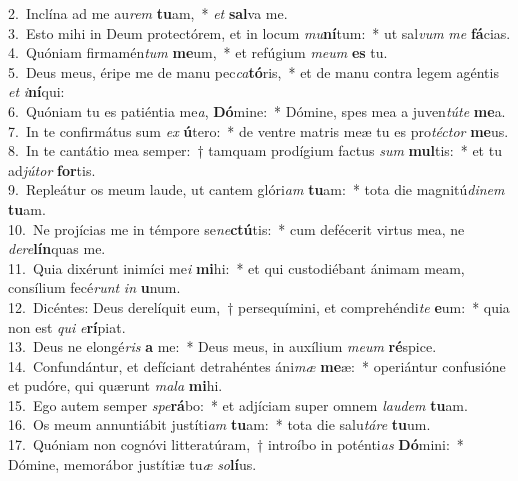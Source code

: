 {2.~}Inclína ad me au\textit{rem} \textbf{tu}am,~* \textit{et} \textbf{sal}va me.\\
{3.~}Esto mihi in Deum protectórem, et in locum \textit{mu}\textbf{ní}tum:~* ut sal\textit{vum} \textit{me} \textbf{fá}cias.\\
{4.~}Quóniam firmamén\textit{tum} \textbf{me}um,~* et refúgium \textit{me}\textit{um} \textbf{es} tu.\\
{5.~}Deus meus, éripe me de manu pec\textit{ca}\textbf{tó}ris,~* et de manu contra legem agéntis \textit{et} \textit{i}\textbf{ní}qui:\\
{6.~}Quóniam tu es patiéntia me\textit{a}, \textbf{Dó}mine:~* Dómine, spes mea a juven\textit{tú}\textit{te} \textbf{me}a.\\
{7.~}In te confirmátus sum \textit{ex} \textbf{ú}tero:~* de ventre matris meæ tu es pro\textit{té}\textit{ctor} \textbf{me}us.\\
{8.~}In te cantátio mea semper:~† tamquam prodígium factus \textit{sum} \textbf{mul}tis:~* et tu ad\textit{jú}\textit{tor} \textbf{for}tis.\\
{9.~}Repleátur os meum laude, ut cantem glóri\textit{am} \textbf{tu}am:~* tota die magnitú\textit{di}\textit{nem} \textbf{tu}am.\\
{10.~}Ne projícias me in témpore se\textit{ne}\textbf{ctú}tis:~* cum defécerit virtus mea, ne \textit{de}\textit{re}\textbf{lín}quas me.\\
{11.~}Quia dixérunt inimíci me\textit{i} \textbf{mi}hi:~* et qui custodiébant ánimam meam, consílium fecé\textit{runt} \textit{in} \textbf{u}num.\\
{12.~}Dicéntes: Deus derelíquit eum,~† persequímini, et comprehéndi\textit{te} \textbf{e}um:~* quia non est \textit{qui} \textit{e}\textbf{rí}piat.\\
{13.~}Deus ne elongé\textit{ris} \textbf{a} me:~* Deus meus, in auxílium \textit{me}\textit{um} \textbf{ré}spice.\\
{14.~}Confundántur, et defíciant detrahéntes áni\textit{mæ} \textbf{me}æ:~* operiántur confusióne et pudóre, qui quærunt \textit{ma}\textit{la} \textbf{mi}hi.\\
{15.~}Ego autem semper \textit{spe}\textbf{rá}bo:~* et adjíciam super omnem \textit{lau}\textit{dem} \textbf{tu}am.\\
{16.~}Os meum annuntiábit justíti\textit{am} \textbf{tu}am:~* tota die salu\textit{tá}\textit{re} \textbf{tu}um.\\
{17.~}Quóniam non cognóvi litteratúram,~† introíbo in poténti\textit{as} \textbf{Dó}mini:~* Dómine, memorábor justítiæ tu\textit{æ} \textit{so}\textbf{lí}us.\\
